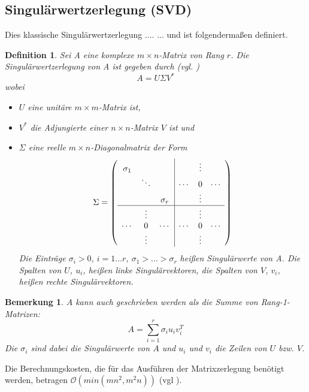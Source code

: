 \documentclass[12pt,a4paper,twoside]{article}
\newtheorem{Definition}[Satz]{Definition}
\newtheorem{Bemerkung}{Bemerkung}
\begin{document}
	\subsection{Singulärwertzerlegung (SVD)}
		Dies klassische Singulärwertzerlegung .... ... und ist folgendermaßen definiert.		
		\begin{Definition}
		Sei A eine komplexe $m\times n$-Matrix von Rang $r$. Die Singulärwertzerlegung von A ist gegeben durch (vgl. 			\cite{deuflhard2008})
		\begin{equation*}
			\label{eq:SVD}
			A=U\Sigma V^* 
		\end{equation*}
		wobei
		\begin{itemize}
			\item $U$ eine unitäre $m\times m$-Matrix ist,
			\item $V^*$ die Adjungierte einer $n\times n$-Matrix $V$ ist und
			\item $\Sigma$ eine reelle $m\times n$-Diagonalmatrix der Form \[
	 		\Sigma = \left(\begin{array}{ccc|ccc}
					\sigma_1 &          &         &       & \vdots &       \\
         			& \ddots   &         & \cdots & 0      & \cdots \\
         			&      &\sigma_r &        & \vdots &        \\
					\hline
        			 &  \vdots  &        &       & \vdots &        \\
					\cdots   & 0       & \cdots   & \cdots & 0      & \cdots \\
        			 &  \vdots  &         &        & \vdots &        \\
					\end{array}\right)
			\]
			Die Einträge $\sigma_i>0$, $i=1...r$, $\sigma_1>...>\sigma_r$ heißen Singulärwerte von A. Die Spalten von $U$, $u_i$, heißen linke Singulärvektoren, die Spalten von $V$, $v_i$, heißen rechte Singulärvektoren.
		\end{itemize}
		\end{Definition}
		\begin{Bemerkung}
			$A$ kann auch geschrieben werden als die Summe von Rang-1-Matrizen:
			\begin{equation*}
				\label{eq:SVDsum}
				A=\sum_{i=1}^r\sigma_i u_i v_i^T
			\end{equation*}
			Die $\sigma_i$ sind dabei die Singulärwerte von $A$ und $u_i$ und $v_i$ die Zeilen von $U$ bzw. $V$.
		\end{Bemerkung}
		Die Berechnungskosten, die für das Ausführen der Matrixzerlegung benötigt werden, betragen $\mathcal{O}(min(mn^2,m^2n))$ (vgl \cite{mahoney2008}).
\end{document}
